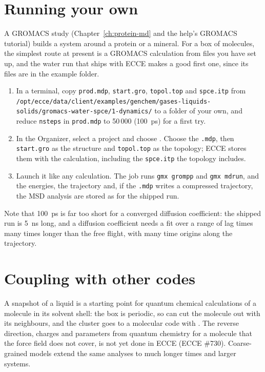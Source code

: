 \section{Running your own}
A GROMACS study (Chapter~\ref{ch:protein-md} and the help's GROMACS tutorial) builds a system around a protein or a mineral. For a box of molecules, the simplest route at present is a GROMACS calculation from files you have set up, and the water run that ships with ECCE makes a good first one, since its files are in the example folder.
\begin{enumerate}
	\item In a terminal, copy \texttt{prod.mdp}, \texttt{start.gro}, \texttt{topol.top} and \texttt{spce.itp} from \texttt{/opt/ecce/data/client/examples/genchem/gases-liquids-solids/gromacs-water-spce/1-dynamics/} to a folder of your own, and reduce \texttt{nsteps} in \texttt{prod.mdp} to 50\,000 (100~ps) for a first try.
	\item In the Organizer, select a project and choose . Choose the \texttt{.mdp}, then \texttt{start.gro} as the structure and \texttt{topol.top} as the topology; ECCE stores them with the calculation, including the \texttt{spce.itp} the topology includes.
	\item Launch it like any calculation. The job runs \texttt{gmx grompp} and \texttt{gmx mdrun}, and the energies, the trajectory and, if the \texttt{.mdp} writes a compressed trajectory, the MSD analysis are stored as for the shipped run.
\end{enumerate}
Note that 100~ps is far too short for a converged diffusion coefficient: the shipped run is 5~ns long, and a diffusion coefficient needs a fit over a range of lag times many times longer than the free flight, with many time origins along the trajectory.

\section{Coupling with other codes}
A snapshot of a liquid is a starting point for quantum chemical calculations of a molecule in its solvent shell: the box is periodic, so  can cut the molecule out with its neighbours, and the cluster goes to a molecular code with . The reverse direction, charges and parameters from quantum chemistry for a molecule that the force field does not cover, is not yet done in ECCE (ECCE \#730). Coarse-grained models extend the same analyses to much longer times and larger systems.
